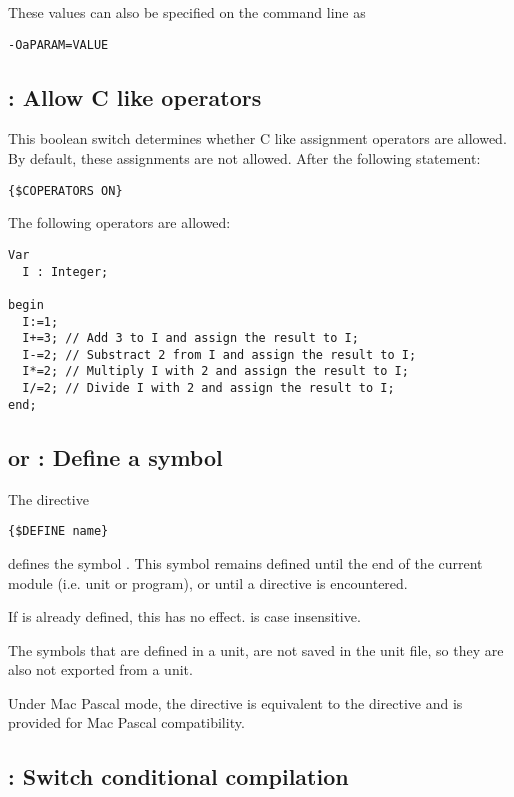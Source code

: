 These values can also be specified on the command line as
\begin{verbatim}
-OaPARAM=VALUE
\end{verbatim}

\subsection{ : Allow C like operators}
This boolean switch determines whether C like assignment operators 
are allowed. By default, these assignments are not allowed.
After the following statement:
\begin{verbatim}
{$COPERATORS ON}
\end{verbatim}
The following operators are allowed:
\begin{verbatim}
Var
  I : Integer;

begin
  I:=1;
  I+=3; // Add 3 to I and assign the result to I;
  I-=2; // Substract 2 from I and assign the result to I;
  I*=2; // Multiply I with 2 and assign the result to I;
  I/=2; // Divide I with 2 and assign the result to I;
end;  
\end{verbatim}

\subsection{ or  : Define a symbol}

The directive
\begin{verbatim}
{$DEFINE name}
\end{verbatim}
defines the symbol . This symbol remains defined until the end of
the current module (i.e. unit or program), or until a  directive is encountered.

If  is already defined, this has no effect.  is case
insensitive.

The symbols that are defined in a unit, are not saved in the unit file,
so they are also not exported from a unit.

Under Mac Pascal mode, the  directive is equivalent to the 
 directive and is provided for Mac Pascal compatibility.

\subsection{ : Switch conditional compilation}

